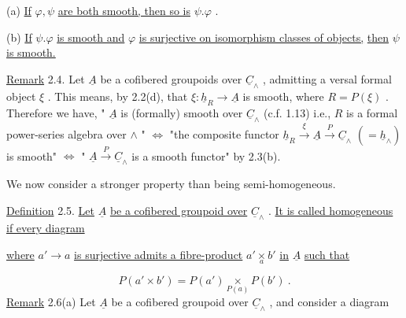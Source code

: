 (a)  \underline{If}  $\varphi, \psi$  \underline{are both smooth, then so is}  $\psi.\varphi$ .

(b)  \underline{If}  $\psi.\varphi$  \underline{is smooth and}  $\varphi$  \underline{is surjective on isomorphism classes of objects,}
\underline{then}  $\psi$  \underline{is smooth.}

\underline{Remark} 2.4.  Let  $\underline{A}$  be a cofibered groupoids over  $\underline{C}_\wedge$ , admitting a versal formal object  $\xi$ . This means, by 2.2(d), that  $\xi : \underline{h}_R \to \underline{A}$  is smooth, where  $R = P(\xi)$ . Therefore we have,  " $\underline{A}$  is (formally) smooth over  $\underline{C}_\wedge$  (c.f. 1.13) i.e.,  $R$  is a formal power-series algebra over  $\wedge$ "  $\Leftrightarrow$  "the composite functor  $\underline{h}_R \xrightarrow{\ \xi\ } \underline{A} \xrightarrow{\ P\ } \underline{C}_\wedge$   $(= \underline{h}_\wedge)$   is smooth"  $\Leftrightarrow$  " $\underline{A} \xrightarrow{\ P\ } \underline{C}_\wedge$  is a smooth functor"  by 2.3(b).

We now consider a stronger property than being semi-homogeneous.

\underline{Definition} 2.5.  \underline{Let}  $\underline{A}$  \underline{be a cofibered groupoid over}  $\underline{C}_\wedge$ . \underline{It is called homogeneous if every diagram}

\begin{center}
\end{center}
\underline{where}  $a' \to a$  \underline{is surjective admits a fibre-product}  $a' \underset{a}{\times} b'$  \underline{in}  $\underline{A}$  \underline{such that}

\begin{equation*}
P(a' \times b') = P(a') \underset{P(a)}{\times} P(b') \ .
\end{equation*}
\underline{Remark} 2.6(a)  Let  $\underline{A}$  be a cofibered groupoid over  $\underline{C}_\wedge$ , and consider a diagram

